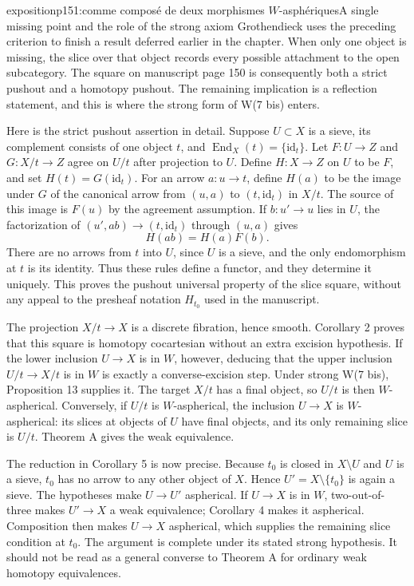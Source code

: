 \begin{dcomment}{exposition}{p151:comme composé de deux morphismes $W$-asphériques}{A single missing point and the role of the strong axiom}
Grothendieck uses the preceding criterion to finish a result deferred earlier in the chapter. When only one object is missing, the slice over that object records every possible attachment to the open subcategory. The square on manuscript page 150 is consequently both a strict pushout and a homotopy pushout. The remaining implication is a reflection statement, and this is where the strong form of W(7 bis) enters.

Here is the strict pushout assertion in detail. Suppose $U\subset X$ is a sieve, its complement consists of one object $t$, and $\operatorname{End}_X(t)=\{\mathrm{id}_t\}$. Let $F:U\to Z$ and $G:X/t\to Z$ agree on $U/t$ after projection to $U$. Define $H:X\to Z$ on $U$ to be $F$, and set $H(t)=G(\mathrm{id}_t)$. For an arrow $a:u\to t$, define $H(a)$ to be the image under $G$ of the canonical arrow from $(u,a)$ to $(t,\mathrm{id}_t)$ in $X/t$. The source of this image is $F(u)$ by the agreement assumption. If $b:u'\to u$ lies in $U$, the factorization of $(u',ab)\to(t,\mathrm{id}_t)$ through $(u,a)$ gives
\[
 H(ab)=H(a)F(b).
\]
There are no arrows from $t$ into $U$, since $U$ is a sieve, and the only endomorphism at $t$ is its identity. Thus these rules define a functor, and they determine it uniquely. This proves the pushout universal property of the slice square, without any appeal to the presheaf notation $H_{t_0}$ used in the manuscript.

The projection $X/t\to X$ is a discrete fibration, hence smooth. Corollary 2 proves that this square is homotopy cocartesian without an extra excision hypothesis. If the lower inclusion $U\to X$ is in $W$, however, deducing that the upper inclusion $U/t\to X/t$ is in $W$ is exactly a converse-excision step. Under strong W(7 bis), Proposition 13 supplies it. The target $X/t$ has a final object, so $U/t$ is then $W$-aspherical. Conversely, if $U/t$ is $W$-aspherical, the inclusion $U\to X$ is $W$-aspherical: its slices at objects of $U$ have final objects, and its only remaining slice is $U/t$. Theorem A gives the weak equivalence.

The reduction in Corollary 5 is now precise. Because $t_0$ is closed in $X\setminus U$ and $U$ is a sieve, $t_0$ has no arrow to any other object of $X$. Hence $U'=X\setminus\{t_0\}$ is again a sieve. The hypotheses make $U\to U'$ aspherical. If $U\to X$ is in $W$, two-out-of-three makes $U'\to X$ a weak equivalence; Corollary 4 makes it aspherical. Composition then makes $U\to X$ aspherical, which supplies the remaining slice condition at $t_0$. The argument is complete under its stated strong hypothesis. It should not be read as a general converse to Theorem A for ordinary weak homotopy equivalences.
\end{dcomment}

